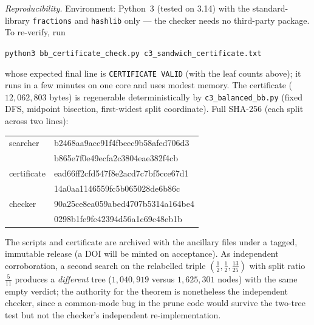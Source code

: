 \documentclass{aims}
\numberwithin{equation}{section}
\theoremstyle{plain}
\theoremstyle{definition}
\theoremstyle{remark}
\begin{document}
\emph{Reproducibility.} Environment: Python~3 (tested on 3.14) with the
standard-library \texttt{fractions} and \texttt{hashlib} only --- the checker
needs no third-party package. To re-verify, run
\begin{center}
\texttt{python3 bb\_certificate\_check.py c3\_sandwich\_certificate.txt}
\end{center}
whose expected final line is \texttt{CERTIFICATE VALID} (with the leaf counts
above); it runs in a few minutes on one core and uses modest memory. The certificate
($12{,}062{,}803$ bytes) is regenerable deterministically by
\texttt{c3\_balanced\_bb.py} (fixed DFS, midpoint bisection, first-widest split
coordinate). Full SHA-256 (each split across two lines):
\begin{center}\ttfamily\footnotesize
\begin{tabular}{@{}ll@{}}
searcher & b2468aa9acc91f4fbeec9b58afed706d3\\
 & b865e7f0e49ecfa2c3804eae382f4cb\\
certificate & ead66ff2cfd547f8e2acd7c7bf5cce67d1\\
 & 14a0aa1146559fc5b065028de6b86c\\
checker & 90a25ce8ea059abed4707b5314a164be4\\
 & 0298b1fe9fe42394d56a1c69c48eb1b\\
\end{tabular}
\end{center}
The scripts and certificate are archived with the ancillary files under a
tagged, immutable release (a DOI will be minted on acceptance). As independent
corroboration, a second search on the relabelled triple
$(\tfrac12,\tfrac12,\tfrac{13}{25})$ with split ratio $\tfrac5{11}$ produces a
\emph{different} tree ($1{,}040{,}919$ versus $1{,}625{,}301$ nodes) with the
same empty verdict; the authority for the theorem is nonetheless the
independent checker, since a common-mode bug in the prune code would survive
the two-tree test but not the checker's independent re-implementation.
\end{document}
